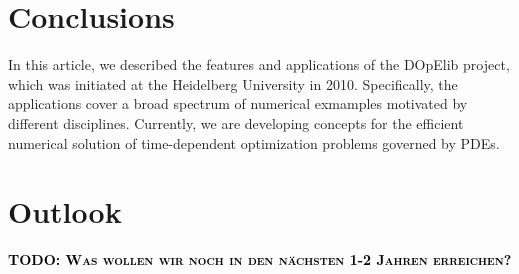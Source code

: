 \documentclass[prodmode,acmtoms]{acmsmall}
\numberwithin{equation}{section}
\newcommand{\todo}[1]{\textbf{\textsc{\textcolor{black}{TODO: #1}}}}
\begin{document}
\section{Conclusions}
\label{conclusions}
In this article, we described the features 
and applications of the DOpElib project, which 
was initiated at the Heidelberg University in 2010.
Specifically, the applications cover a broad 
spectrum of numerical exmamples motivated 
by different disciplines. 
Currently, we are developing concepts for the efficient 
numerical solution of time-dependent optimization
problems governed by PDEs. 

\section{Outlook}
\todo{Was wollen wir noch in den nächsten 1-2 Jahren erreichen?}

%


%
\end{document}
